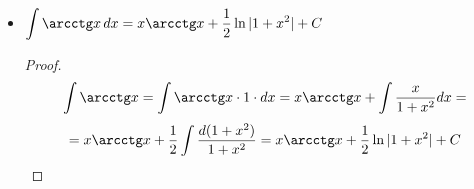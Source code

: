 \begin{itemize}
	\item $\displaystyle \int \arcctg x\,dx = x \arcctg x + \frac12 \ln |1 + x^2| + C$
	\begin{proof}
	\begin{equation*}
	\int \arcctg x =
	\int \arcctg x \cdot 1 \cdot dx =
	x \arcctg x + \int \frac{x}{1 + x^2} dx =
	\end{equation*}
	\begin{equation*}
	= x \arcctg x + \frac12 \int \frac{d(1 + x^2)}{1 + x^2} =
	x \arcctg x + \frac12 \ln |1 + x^2| + C
	\end{equation*}
	\end{proof}
\end{itemize}